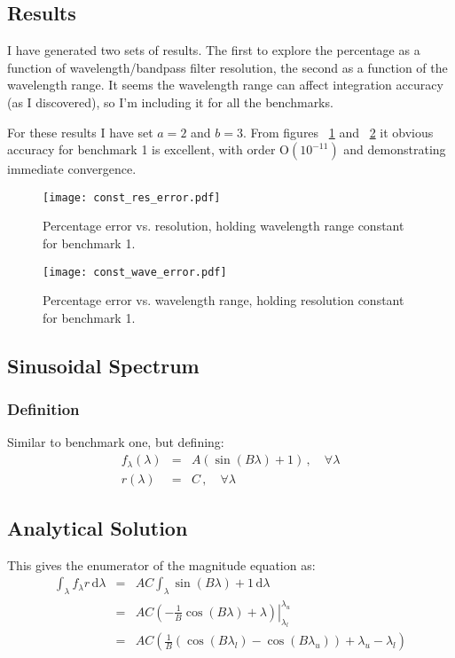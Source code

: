 \documentclass[12pt]{scrartcl}
\newcommand{\dx}[1]{\ensuremath{\,\mathrm{d}#1}}
\begin{document}
\subsection{Results}

I have generated two sets of results. The first to explore the
percentage as a function of wavelength/bandpass filter resolution, the
second as a function of the wavelength range. It seems the wavelength
range can affect integration accuracy (as I discovered), so I'm
including it for all the benchmarks.

For these results I have set $a=2$ and $b=3$. From figures
~\ref{fig:const_res} and ~\ref{fig:const_wave} it obvious accuracy for
benchmark 1 is excellent, with order $\mathrm{O}(10^{-11})$ and
demonstrating immediate convergence.

\begin{figure}[ht]
  \centerline{\texttt{[image: const\_res\_error.pdf]}}
  \caption{Percentage error vs. resolution, holding wavelength range
    constant for benchmark 1.}
  \label{fig:const_res}
\end{figure}

\begin{figure}[ht]
  \centerline{\texttt{[image: const\_wave\_error.pdf]}}
  \caption{Percentage error vs. wavelength range, holding resolution
    constant for benchmark 1.}
  \label{fig:const_wave}
\end{figure}


\subsection{Sinusoidal Spectrum}

\subsubsection{Definition}

Similar to benchmark one, but defining:
\begin{eqnarray*}
f_\lambda(\lambda) & = & A\left(\sin(B\lambda) + 1\right) \, , \quad \forall \lambda \\
r(\lambda) & = & C \, , \quad \forall \lambda
\end{eqnarray*}

\subsection{Analytical Solution}

This gives the enumerator of the magnitude equation as:
\begin{eqnarray*}
\int_\lambda f_\lambda r \dx{\lambda}
& = & AC \int_\lambda \sin(B\lambda) + 1 \dx{\lambda} \\
& = & \left. AC\left( -\frac{1}{B}\cos(B\lambda) + \lambda \right)
\right|_{\lambda_l}^{\lambda_u} \\
& = & AC\left( \frac{1}{B}\left( \cos(B\lambda_l) - \cos(B\lambda_u)
  \right) + \lambda_u - \lambda_l \right)
\end{eqnarray*}
\end{document}
